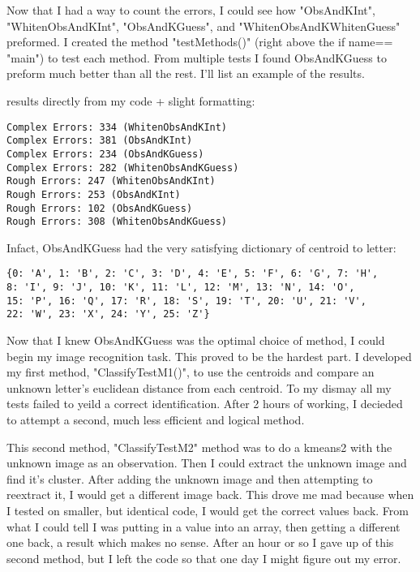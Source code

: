 \documentclass[a4paper]{article}
\begin{document}
Now that I had a way to count the errors, I could see how "ObsAndKInt", "WhitenObsAndKInt", "ObsAndKGuess", and "WhitenObsAndKWhitenGuess" preformed. I created the method "testMethods()" (right above the if \textunderscore\textunderscore name\textunderscore \textunderscore == "main") to test each method. From multiple tests I found ObsAndKGuess to preform much better than all the rest. I'll list an example of the results. 

results directly from my code + slight formatting:

\begin{verbatim}
Complex Errors: 334 (WhitenObsAndKInt)
Complex Errors: 381 (ObsAndKInt)
Complex Errors: 234 (ObsAndKGuess)
Complex Errors: 282 (WhitenObsAndKGuess)
Rough Errors: 247 (WhitenObsAndKInt)
Rough Errors: 253 (ObsAndKInt)
Rough Errors: 102 (ObsAndKGuess)
Rough Errors: 308 (WhitenObsAndKGuess)
\end{verbatim}

 Infact, ObsAndKGuess had the very satisfying dictionary of centroid to letter:
 
\begin{verbatim}
{0: 'A', 1: 'B', 2: 'C', 3: 'D', 4: 'E', 5: 'F', 6: 'G', 7: 'H', 
8: 'I', 9: 'J', 10: 'K', 11: 'L', 12: 'M', 13: 'N', 14: 'O', 
15: 'P', 16: 'Q', 17: 'R', 18: 'S', 19: 'T', 20: 'U', 21: 'V', 
22: 'W', 23: 'X', 24: 'Y', 25: 'Z'}
\end{verbatim}

Now that I knew ObsAndKGuess was the optimal choice of method, I could begin my image recognition task. This proved to be the hardest part. I developed my first method, "ClassifyTestM1()", to use the centroids and compare an unknown letter's euclidean distance from each centroid. To my dismay all my tests failed to yeild a correct identification. After 2 hours of working, I decieded to attempt a second, much less efficient and logical method. 

This second method, "ClassifyTestM2" method was to do a kmeans2 with the unknown image as an observation. Then I could extract the unknown image and find it's cluster. After adding the unknown image and then attempting to reextract it, I would get a different image back. This drove me mad because when I tested on smaller, but identical code, I would get the correct values back. From what I could tell I was putting in a value into an array, then getting a different one back, a result which makes no sense. After an hour or so I gave up of this second method, but I left the code so that one day I might figure out my error.
\end{document}
